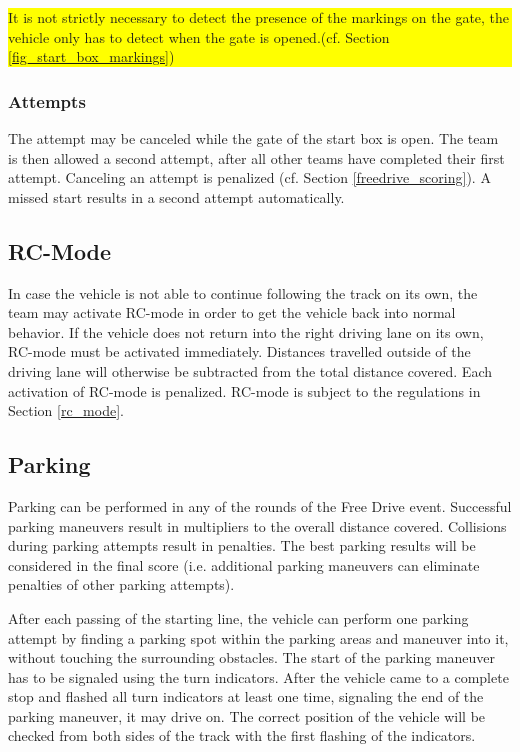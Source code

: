 \documentclass[a4paper]{report}
\newlength\colorboxwidth
\begin{document}
{\colorbox{yellow}{\parbox{\colorboxwidth}{It is not strictly necessary to detect the presence of the markings on the gate, the vehicle only has to detect when the gate is opened.(cf. Section \ref{fig_start_box_markings})}}

\subsubsection{Attempts} 

The attempt may be canceled while the gate of the start box is open. The team is then allowed a second attempt, after all other teams have completed their first attempt. Canceling an attempt is penalized (cf. Section \ref{freedrive_scoring}). A missed start results in a second attempt automatically. 

\subsection{RC-Mode}

In case the vehicle is not able to continue following the track on its own, the team may activate RC-mode in order to get the vehicle back into normal behavior. If the vehicle does not return into the right driving lane on its own, RC-mode must be activated immediately. Distances travelled outside of the driving lane will otherwise be subtracted from the total distance covered. Each activation of RC-mode is penalized. RC-mode is subject to the regulations in Section \ref{rc_mode}. 

\subsection{Parking}

Parking can be performed in any of the rounds of the Free Drive event. Successful parking maneuvers result in multipliers to the overall distance covered. Collisions during parking attempts result in penalties. The best parking results will be considered in the final score (i.e. additional parking maneuvers can eliminate penalties of other parking attempts). 

After each passing of the starting line, the vehicle can perform one parking attempt by finding a parking spot within the parking areas and maneuver into it, without touching the surrounding obstacles. The start of the parking maneuver has to be signaled using the turn indicators. After the vehicle came to a complete stop and flashed all turn indicators at least one time, signaling the end of the parking maneuver, it may drive on. The correct position of the vehicle will be checked from both sides of the track with the first flashing of the indicators. 

}
\end{document}
